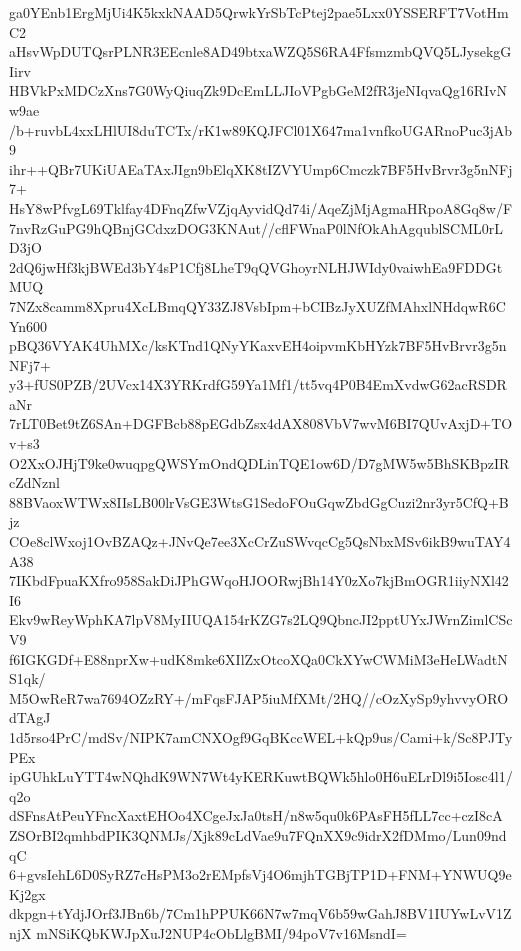 ga0YEnb1ErgMjUi4K5kxkNAAD5QrwkYrSbTcPtej2pae5Lxx0YSSERFT7VotHmC2
aHsvWpDUTQsrPLNR3EEcnle8AD49btxaWZQ5S6RA4FfsmzmbQVQ5LJysekgGIirv
HBVkPxMDCzXns7G0WyQiuqZk9DcEmLLJIoVPgbGeM2fR3jeNIqvaQg16RIvNw9ae
/b+ruvbL4xxLHlUI8duTCTx/rK1w89KQJFCl01X647ma1vnfkoUGARnoPuc3jAb9
ihr++QBr7UKiUAEaTAxJIgn9bElqXK8tIZVYUmp6Cmczk7BF5HvBrvr3g5nNFj7+
HsY8wPfvgL69Tklfay4DFnqZfwVZjqAyvidQd74i/AqeZjMjAgmaHRpoA8Gq8w/F
7nvRzGuPG9hQBnjGCdxzDOG3KNAut//cflFWnaP0lNfOkAhAgqublSCML0rLD3jO
2dQ6jwHf3kjBWEd3bY4sP1Cfj8LheT9qQVGhoyrNLHJWIdy0vaiwhEa9FDDGtMUQ
7NZx8camm8Xpru4XcLBmqQY33ZJ8VsbIpm+bCIBzJyXUZfMAhxlNHdqwR6CYn600
pBQ36VYAK4UhMXc/ksKTnd1QNyYKaxvEH4oipvmKbHYzk7BF5HvBrvr3g5nNFj7+
y3+fUS0PZB/2UVcx14X3YRKrdfG59Ya1Mf1/tt5vq4P0B4EmXvdwG62acRSDRaNr
7rLT0Bet9tZ6SAn+DGFBcb88pEGdbZsx4dAX808VbV7wvM6BI7QUvAxjD+TOv+s3
O2XxOJHjT9ke0wuqpgQWSYmOndQDLinTQE1ow6D/D7gMW5w5BhSKBpzIRcZdNznl
88BVaoxWTWx8IIsLB00lrVsGE3WtsG1SedoFOuGqwZbdGgCuzi2nr3yr5CfQ+Bjz
COe8clWxoj1OvBZAQz+JNvQe7ee3XcCrZuSWvqcCg5QsNbxMSv6ikB9wuTAY4A38
7IKbdFpuaKXfro958SakDiJPhGWqoHJOORwjBh14Y0zXo7kjBmOGR1iiyNXl42I6
Ekv9wReyWphKA7lpV8MyIIUQA154rKZG7s2LQ9QbncJI2pptUYxJWrnZimlCScV9
f6IGKGDf+E88nprXw+udK8mke6XIlZxOtcoXQa0CkXYwCWMiM3eHeLWadtNS1qk/
M5OwReR7wa7694OZzRY+/mFqsFJAP5iuMfXMt/2HQ//cOzXySp9yhvvyOROdTAgJ
1d5rso4PrC/mdSv/NIPK7amCNXOgf9GqBKccWEL+kQp9us/Cami+k/Sc8PJTyPEx
ipGUhkLuYTT4wNQhdK9WN7Wt4yKERKuwtBQWk5hlo0H6uELrDl9i5Iosc4l1/q2o
dSFnsAtPeuYFncXaxtEHOo4XCgeJxJa0tsH/n8w5qu0k6PAsFH5fLL7cc+czI8cA
ZSOrBI2qmhbdPIK3QNMJs/Xjk89cLdVae9u7FQnXX9c9idrX2fDMmo/Lun09ndqC
6+gvsIehL6D0SyRZ7cHsPM3o2rEMpfsVj4O6mjhTGBjTP1D+FNM+YNWUQ9eKj2gx
dkpgn+tYdjJOrf3JBn6b/7Cm1hPPUK66N7w7mqV6b59wGahJ8BV1IUYwLvV1ZnjX
mNSiKQbKWJpXuJ2NUP4cObLlgBMI/94poV7v16MsndI=
